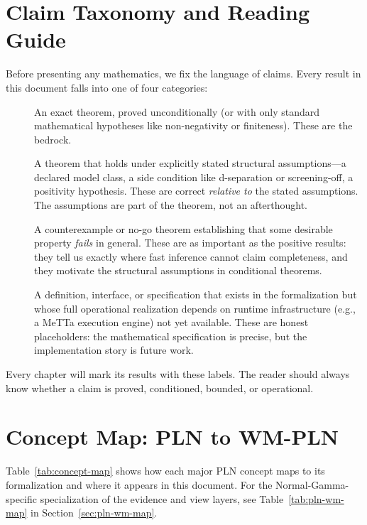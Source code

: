 \documentclass[11pt,openany]{report}
\begin{document}
\section{Claim Taxonomy and Reading Guide}
\label{ch:taxonomy}

Before presenting any mathematics, we fix the language of claims.  Every
result in this document falls into one of four categories:

\begin{description}
\item[\claimCore{}] An exact theorem, proved unconditionally (or with only
  standard mathematical hypotheses like non-negativity or finiteness).
  These are the bedrock.

\item[\claimConditional{}] A theorem that holds under explicitly stated
  structural assumptions---a declared model class, a side condition like
  d-separation or screening-off, a positivity hypothesis.  These are correct
  \emph{relative to} the stated assumptions.  The assumptions are part of the
  theorem, not an afterthought.

\item[\claimBoundary{}] A counterexample or no-go theorem establishing that
  some desirable property \emph{fails} in general.  These are as important as
  the positive results: they tell us exactly where fast inference cannot claim
  completeness, and they motivate the structural assumptions in conditional
  theorems.

\item[\claimOperational{}] A definition, interface, or specification that
  exists in the formalization but whose full operational realization depends
  on runtime infrastructure (e.g., a MeTTa execution engine) not yet
  available.  These are honest placeholders: the mathematical specification
  is precise, but the implementation story is future work.
\end{description}

Every chapter will mark its results with these labels.  The reader should
always know whether a claim is proved, conditioned, bounded, or operational.

\section{Concept Map: PLN to WM-PLN}
\label{sec:concept-map}

Table~\ref{tab:concept-map} shows how each major PLN concept maps to its
\xiPLN{} formalization and where it appears in this document.  For the
Normal-Gamma-specific specialization of the evidence and view layers,
see Table~\ref{tab:pln-wm-map} in Section~\ref{sec:pln-wm-map}.
\end{document}
